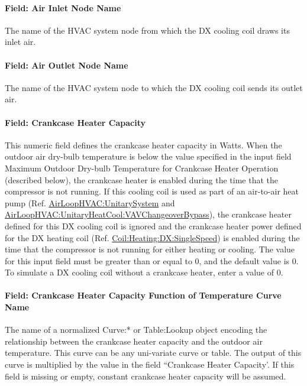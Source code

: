 \paragraph{Field: Air Inlet Node Name}\label{field-air-inlet-node-name-10}

The name of the HVAC system node from which the DX cooling coil draws its inlet air.

\paragraph{Field: Air Outlet Node Name}\label{field-air-outlet-node-name-10}

The name of the HVAC system node to which the DX cooling coil sends its outlet air.

\paragraph{Field: Crankcase Heater Capacity}\label{field-crankcase-heater-capacity-1}

This numeric field defines the crankcase heater capacity in Watts. When the outdoor air dry-bulb temperature is below the value specified in the input field Maximum Outdoor Dry-bulb Temperature for Crankcase Heater Operation (described below), the crankcase heater is enabled during the time that the compressor is not running. If this cooling coil is used as part of an air-to-air heat pump (Ref. \hyperref[airloophvacunitarysystem]{AirLoopHVAC:UnitarySystem} and \hyperref[airloophvacunitaryheatcoolvavchangeoverbypass]{AirLoopHVAC:UnitaryHeatCool:VAVChangeoverBypass}), the crankcase heater defined for this DX cooling coil is ignored and the crankcase heater power defined for the DX heating coil (Ref. \hyperref[coilheatingdxsinglespeed]{Coil:Heating:DX:SingleSpeed}) is enabled during the time that the compressor is not running for either heating or cooling. The value for this input field must be greater than or equal to 0, and the default value is 0. To simulate a DX cooling coil without a crankcase heater, enter a value of 0.

\paragraph{Field: Crankcase Heater Capacity Function of Temperature Curve Name}

The name of a normalized Curve:* or Table:Lookup object encoding the relationship between the crankcase heater capacity and the outdoor air temperature. This curve can be any uni-variate curve or table. The output of this curve is multiplied by the value in the field ``Crankcase Heater Capacity'. If this field is missing or empty, constant crankcase heater capacity will be
assumed.

